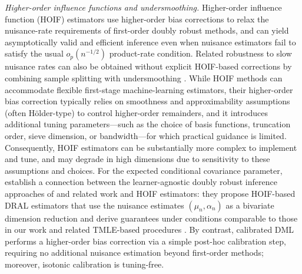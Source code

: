 \documentclass[11pt]{article}
\theoremstyle{plain}
\begin{document}
\medskip\noindent \emph{Higher-order influence functions and undersmoothing.} {\color{purple}
Higher-order influence function (HOIF) estimators \citep{robins2008higher, liu2017semiparametric}
use higher-order bias corrections to relax the nuisance-rate requirements of
first-order doubly robust methods, and can yield asymptotically valid and
efficient inference even when nuisance estimators fail to satisfy the usual
\(o_p(n^{-1/2})\) product-rate condition. Related robustness to slow nuisance rates can also be obtained without explicit HOIF-based corrections by combining sample splitting with undersmoothing
\citep{newey2018cross, mcgrath2022nuisance, mcclean2024double}. While HOIF methods can accommodate
flexible first-stage machine-learning estimators, their higher-order bias
correction typically relies on smoothness and approximability assumptions
(often H\"older-type) to control higher-order remainders, and it introduces
additional tuning parameters---such as the choice of basis functions,
truncation order, sieve dimension, or bandwidth---for which practical guidance
is limited. Consequently, HOIF estimators can be substantially more complex to implement
and tune, and may degrade in high dimensions due to sensitivity to these
assumptions and choices. For the expected conditional covariance parameter,
\cite{bonvini2024doubly} establish a connection between the learner-agnostic
doubly robust inference approaches of \cite{benkeser2017doubly} and related work and HOIF
estimators: they propose HOIF-based DRAL estimators that use the nuisance
estimates \((\mu_n,\alpha_n)\) as a bivariate dimension reduction and derive
guarantees under conditions comparable to those in our work and related
TMLE-based procedures \citep{benkeser2017doubly}. By contrast, calibrated DML
performs a higher-order bias correction via a simple post-hoc calibration step,
requiring no additional nuisance estimation beyond first-order methods; moreover,
isotonic calibration is tuning-free.}
  
 
\end{document}
